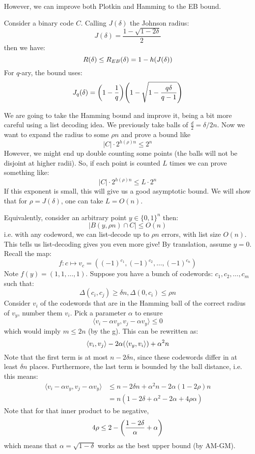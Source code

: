 However,
we can improve both Plotkin and Hamming to the EB bound.
\begin{theorem}
    Consider a binary code $C$. Calling $J(\delta)$ the Johnson radius:
    \[ J(\delta) = \frac{1 - \sqrt{1 - 2 \delta}}{2} \]
    then we have:
    \[ R(\delta) \leq R_{EB}(\delta) = 1 - h\qty(J(\delta))\]
    For $q$-ary, the bound uses:
    \[ J_q(\delta) = \qty(1 - \frac{1}{q})\qty(1 - \sqrt{1 - \frac{q \delta}{q - 1}}) \]

\begin{proof*}
    We are going to take the Hamming bound and improve it, being a bit more careful using a list decoding idea.
    We previously take balls of $\frac{d}{2} = \delta/2 n$. Now we want to expand the radius to some $\rho n$
    and prove a bound like
    \[ |C| \cdot 2^{h(\rho) n} \leq 2^n \]
    However, we might end up double counting some points (the balls will not be disjoint at higher radii).
    So, if each point is counted $L$ times we can prove something like:
    \[ |C| \cdot 2^{h(\rho) n} \leq L \cdot 2^n \]
    If this exponent is small, this will give us a good asymptotic bound. We will show
    that for $\rho = J(\delta)$, one can take $L = O(n)$.

    Equivalently, consider an arbitrary point $y \in \{0, 1\}^n$ then:
    \[ |B(y, \rho n) \cap C| \leq O(n) \]
    i.e. with any codeword, we can list-decode up to $\rho n$ errors, with list size $O(n)$.
    This tells us list-decoding gives you even more give!
    By translation, assume $y = 0$. Recall the map:
    \[f : c \mapsto v_c = ((-1)^{c_1}, (-1)^{c_2}, \dots, (-1)^{c_n}) \]
    Note $f(y) = (1, 1, \dots, 1)$. Suppose you have a bunch of codewords: $c_1, c_2, \dots, c_m$
    such that:
    \[ \Delta(c_i, c_j) \geq \delta n, \Delta(0, c_i) \leq \rho n \]
    Consider $v_i$ of the codewords that are in the Hamming ball of the correct radius of $v_y$, number them $v_i$.
    Pick a parameter $\alpha$ to ensure
    \[ \langle v_i - \alpha v_y, v_j - \alpha v_y \rangle \leq 0 \]
    which would imply $m \leq 2n$ (by the g). This can be rewritten as:
    \[ \langle v_i, v_j \rangle - 2 \alpha \qty(\langle v_y, v_i \rangle) + \alpha^2 n \]
    Note that the first term is at most $n - 2\delta n$, since these 
    codewords differ in at least $\delta n$ places. Furthermore, the last term is bounded by the ball distance, i.e. this means:
    \begin{align*}
        \langle v_i - \alpha v_y, v_j - \alpha v_y \rangle &\leq n - 2\delta n + \alpha^2 n - 2 \alpha(1 - 2 \rho)n \\
        &= n(1 - 2 \delta + \alpha^2 - 2\alpha + 4 \rho \alpha)
    \end{align*}
    Note that for that inner product to be negative,
    \[ 4 \rho \leq 2 - \qty(\frac{1 - 2\delta}{\alpha} + \alpha) \]
    which means that $\alpha = \sqrt{1 - \delta}$ works as the best upper bound (by AM-GM).
\end{proof*}
\end{theorem}


